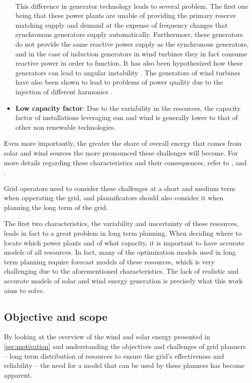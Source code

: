 \begin{itemize}
    \\This difference in generator technology leads to several problem. The first one being that these power plants are unable of providing the primary reserve matching supply and demand at the expense of frequency changes that synchronous generators supply automatically. Furthermore, these generators do not provide the same reactive power supply as the synchronous generators, and in the case of induction generators in wind turbines they in fact consume reactive power in order to function. It has also been hypothesized how these generators can lead to angular instability \cite{vittal_raja_ayyanar_2023}. The generators of wind turbines have also been shown to lead to problems of power quality due to the injection of different harmonics \cite{muljadi_butterfield_chacon_romanowitz_2006}. 
    \item \textbf{Low capacity factor}: Due to the variability in the resources, the capacity factor of installations leveraging sun and wind is generally lower to that of other non renewable technologies. 
\end{itemize}

Even more importantly, the greater the share of overall energy that comes from solar and wind sources the more pronounced these challenges will become. For more details regarding these characteristics and their consequences, refer to \cite{ahmed_fahad_2020}, \cite{kumar_pandey_sinha_2016} and \cite{steen_goop_2014}.

Grid operators need to consider these challenges at a short and medium term when opperating the grid, and plannificators should also consider it when planning the long term of the grid. 

The first two characteristics, the variability and uncertainty of these resources, leads in fact to a great problem in long term planning. When deciding where to locate which power plants and of what capacity, it is important to have accurate models of all resources. In fact, many of the optimization models used in long term planning require forecast models of these resources, which is very challenging due to the aforementioned characteristics. The lack of realistic and accurate models of solar and wind energy generation is precisely what this work aims to solve.

\subsection{Objective and scope}
By looking at the overview of the wind and solar energy presented in \autoref{sec:motivation}  and understanding the objectives and challenges of grid planners -- long term distribution of resources to ensure the grid's effectiveness and reliability -- the need for a model that can be used by these planners has become apparent. 

